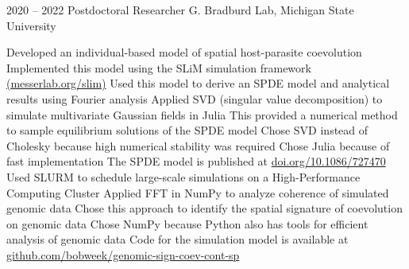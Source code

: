 \documentclass[9pt]{developercv} %
\begin{document}
\begin{entrylist}
{\begin{outline}[itemize]
                \end{outline}}
               \entry
               {2020 -- 2022}
               {Postdoctoral Researcher}
               {G. Bradburd Lab, Michigan State University}
               {\vspace{-10 pt}\begin{outline}[itemize]
                    \1 Developed an individual-based model of spatial host-parasite coevolution
                        \vspace{-6 pt} \2[$\cdot$] Implemented this model using the SLiM simulation framework \href{https://messerlab.org/slim/}{\footnotesize{(messerlab.org/slim)}}
                        \vspace{-3 pt} \2[$\cdot$] Used this model to derive an SPDE model and analytical results using Fourier analysis
                        \vspace{-6 pt} \1 Applied SVD (singular value decomposition) to simulate multivariate Gaussian fields in Julia
                        \vspace{-6 pt}\2[$\cdot$] This provided a numerical method to sample equilibrium solutions of the SPDE model 
                        \vspace{-3 pt}\2[$\cdot$] Chose SVD instead of Cholesky because high numerical stability was required
                        \vspace{-3 pt}\2[$\cdot$] Chose Julia because of fast implementation
                    \vspace{-6 pt} \1 The SPDE model is published at \href{https://doi.org/10.1086/727470}{\footnotesize{doi.org/10.1086/727470}}
                    \vspace{-6 pt} \1 Used SLURM to schedule large-scale simulations on a High-Performance Computing Cluster
                    \vspace{-6 pt}\1 Applied FFT in NumPy to analyze coherence of simulated genomic data
                        \vspace{-6 pt} \2[$\cdot$] Chose this approach to identify the spatial signature of coevolution on genomic data
                        \vspace{-3 pt} \2[$\cdot$] Chose NumPy because Python also has tools for efficient analysis of genomic data
                    \vspace{-6 pt} \1 Code for the simulation model is available at \href{https://github.com/bobweek/genomic-sign-coev-cont-sp}{\footnotesize{github.com/bobweek/genomic-sign-coev-cont-sp}}
                \end{outline}}                    

\end{entrylist}
\end{document}
